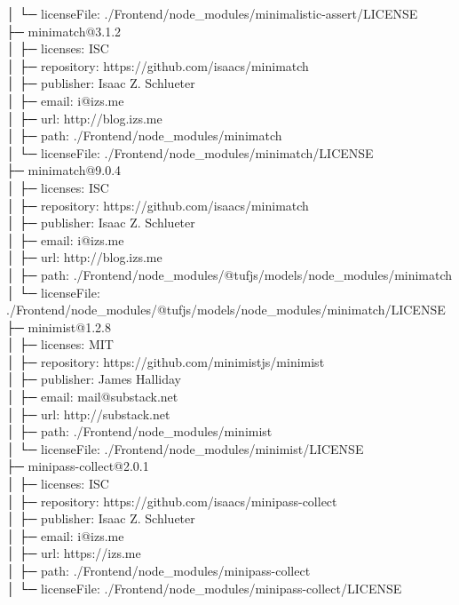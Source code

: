 │  └─ licenseFile: ./Frontend/node\_modules/minimalistic-assert/LICENSE\\
├─ minimatch@3.1.2\\
│  ├─ licenses: ISC\\
│  ├─ repository: https://github.com/isaacs/minimatch\\
│  ├─ publisher: Isaac Z. Schlueter\\
│  ├─ email: i@izs.me\\
│  ├─ url: http://blog.izs.me\\
│  ├─ path: ./Frontend/node\_modules/minimatch\\
│  └─ licenseFile: ./Frontend/node\_modules/minimatch/LICENSE\\
├─ minimatch@9.0.4\\
│  ├─ licenses: ISC\\
│  ├─ repository: https://github.com/isaacs/minimatch\\
│  ├─ publisher: Isaac Z. Schlueter\\
│  ├─ email: i@izs.me\\
│  ├─ url: http://blog.izs.me\\
│  ├─ path: ./Frontend/node\_modules/@tufjs/models/node\_modules/minimatch\\
│  └─ licenseFile: ./Frontend/node\_modules/@tufjs/models/node\_modules/minimatch/LICENSE\\
├─ minimist@1.2.8\\
│  ├─ licenses: MIT\\
│  ├─ repository: https://github.com/minimistjs/minimist\\
│  ├─ publisher: James Halliday\\
│  ├─ email: mail@substack.net\\
│  ├─ url: http://substack.net\\
│  ├─ path: ./Frontend/node\_modules/minimist\\
│  └─ licenseFile: ./Frontend/node\_modules/minimist/LICENSE\\
├─ minipass-collect@2.0.1\\
│  ├─ licenses: ISC\\
│  ├─ repository: https://github.com/isaacs/minipass-collect\\
│  ├─ publisher: Isaac Z. Schlueter\\
│  ├─ email: i@izs.me\\
│  ├─ url: https://izs.me\\
│  ├─ path: ./Frontend/node\_modules/minipass-collect\\
│  └─ licenseFile: ./Frontend/node\_modules/minipass-collect/LICENSE\\
